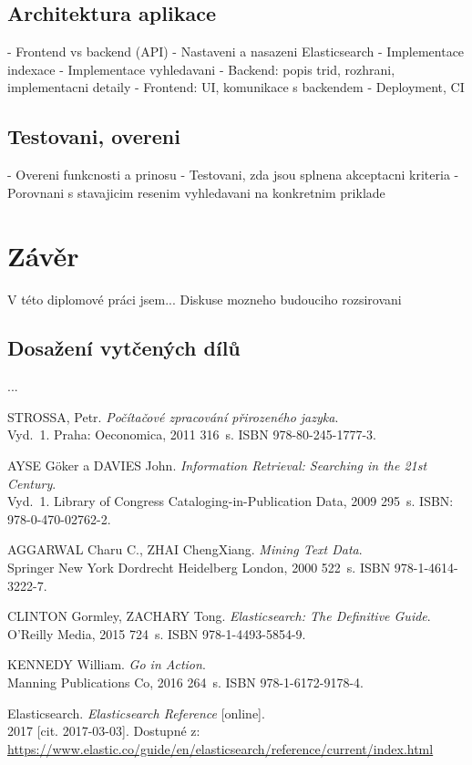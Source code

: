 \documentclass[FM,DP]{tulthesis}
\begin{document}
\section{Architektura aplikace}
- Frontend vs backend (API)
- Nastaveni a nasazeni Elasticsearch
  - Implementace indexace
  - Implementace vyhledavani
- Backend: popis trid, rozhrani, implementacni detaily
- Frontend: UI, komunikace s backendem
- Deployment, CI

\section{Testovani, overeni}
- Overeni funkcnosti a prinosu
- Testovani, zda jsou splnena akceptacni kriteria
- Porovnani s stavajicim resenim vyhledavani na konkretnim priklade


\chapter{Závěr}

V této diplomové práci jsem...
Diskuse mozneho budouciho rozsirovani

\section{Dosažení vytčených dílů}
...


\begin{thebibliography}{Mm99}

 STROSSA, Petr. \emph{Počítačové zpracování přirozeného jazyka}. \\
Vyd.~1. Praha: Oeconomica, 2011 316~s. ISBN 978-80-245-1777-3.

 AYSE Göker a DAVIES John. \emph{Information Retrieval: Searching in the 21st Century}. \\
Vyd.~1. Library of Congress Cataloging-in-Publication Data, 2009 295~s. ISBN: 978-0-470-02762-2.

 AGGARWAL Charu C., ZHAI ChengXiang. \emph{Mining Text Data}. \\
Springer New York Dordrecht Heidelberg London, 2000 522~s. ISBN 978-1-4614-3222-7.

 CLINTON Gormley, ZACHARY Tong. \emph{Elasticsearch: The Definitive Guide}. \\
O'Reilly Media, 2015 724~s. ISBN 978-1-4493-5854-9.

 KENNEDY William. \emph{Go in Action}. \\
Manning Publications Co, 2016 264~s. ISBN 978-1-6172-9178-4.

 Elasticsearch. \emph{Elasticsearch Reference} [online]. \\
2017 [cit. 2017-03-03]. Dostupné z:\\
\url{https://www.elastic.co/guide/en/elasticsearch/reference/current/index.html}

\end{thebibliography}
\end{document}
